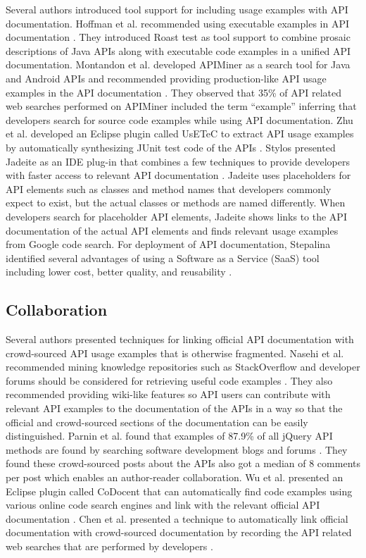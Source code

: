 \documentclass[11pt,oneside]{book}
\begin{document}
Several authors introduced tool support for including usage examples with API documentation. Hoffman et al. recommended using executable examples in API documentation \cite{Hoffman_api_documentation}. They introduced Roast test as tool support  to combine prosaic descriptions of Java APIs along with executable code examples in a unified API documentation. Montandon et al. developed APIMiner as a search tool for Java and Android APIs and recommended providing production-like API usage examples in the API documentation \cite{montandon2013documenting}. They observed that 35\% of API related web searches performed on APIMiner included the term “example” inferring that developers search for source code examples while using API documentation. Zhu et al. developed an Eclipse plugin called UsETeC to extract API usage examples by automatically synthesizing JUnit test code of the APIs \cite{zhu2014mining}. Stylos presented Jadeite as an IDE plug-in that combines a few techniques to provide developers with faster access to relevant API documentation \cite{Jadeite}. Jadeite uses placeholders for API elements such as classes and method names that developers commonly expect to exist, but the actual classes or methods are named differently. When developers search for placeholder API elements, Jadeite shows links to the API documentation of the actual API elements and finds relevant usage examples from Google code search. For deployment of API documentation, Stepalina identified several advantages of using a Software as a Service (SaaS) tool including lower cost, better quality, and reusability \cite{Stepalina_saas}.


\subsection{Collaboration} %


Several authors presented techniques for linking official API documentation with crowd-sourced API usage examples that is otherwise fragmented. Nasehi et al. recommended mining knowledge repositories such as StackOverflow and developer forums should be considered for retrieving useful code examples \cite{Nasehi_what_makes}. They also recommended providing wiki-like features so API users can contribute with relevant API examples to the documentation of the APIs in a way so that the official and crowd-sourced sections of the documentation can be easily distinguished. Parnin et al. found that examples of 87.9\% of all jQuery API methods are found by searching software development blogs and forums \cite{Parnin_measuring}. They found these crowd-sourced posts about the APIs also got a median of 8 comments per post which enables an author-reader collaboration. Wu et al. presented an Eclipse plugin called CoDocent that can automatically find code examples using various online code search engines and link with the relevant official API documentation \cite{wu2010codocent}. Chen et al. presented a technique to automatically link official documentation with crowd-sourced documentation by recording the API related web searches that are performed by developers \cite{Chen_who_asked}.
\end{document}
